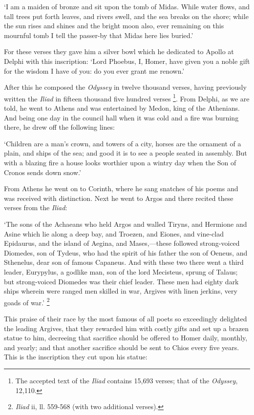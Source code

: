 ‘I am a maiden of bronze and sit upon the tomb of Midas. While water
flows, and tall trees put forth leaves, and rivers swell, and the sea breaks on
the shore; while the sun rises and shines and the bright moon also, ever
remaining on this mournful tomb I tell the passer-by that Midas here lies
buried.’

For these verses they gave him a silver bowl which he dedicated to Apollo at
Delphi with this inscription: ‘Lord Phoebus, I, Homer, have given you a
noble gift for the wisdom I have of you: do you ever grant me renown.’

After this he composed the \emph{Odyssey} in twelve thousand verses,
having previously written the \emph{Iliad} in fifteen thousand five
hundred verses \footnote{The accepted text of the
\emph{Iliad} contains 15,693 verses; that of the \emph{Odyssey},
12,110.}. From Delphi, as we are told, he
went to Athens and was entertained by Medon, king of the Athenians. And being
one day in the council hall when it was cold and a fire was burning there, he
drew off the following lines:

‘Children are a man’s crown, and towers of a city, horses are the
ornament of a plain, and ships of the sea; and good it is to see a people
seated in assembly. But with a blazing fire a house looks worthier upon a
wintry day when the Son of Cronos sends down snow.’

From Athens he went on to Corinth, where he sang snatches of his poems and was
received with distinction. Next he went to Argos and there recited these verses
from the \emph{Iliad}:

‘The sons of the Achaeans who held Argos and walled Tiryns, and Hermione
and Asine which lie along a deep bay, and Troezen, and Eiones, and vine-clad
Epidaurus, and the island of Aegina, and Mases,—these followed
strong-voiced Diomedes, son of Tydeus, who had the spirit of his father the son
of Oeneus, and Sthenelus, dear son of famous Capaneus. And with these two there
went a third leader, Eurypylus, a godlike man, son of the lord Mecisteus,
sprung of Talaus; but strong-voiced Diomedes was their chief leader. These men
had eighty dark ships wherein were ranged men skilled in war, Argives with
linen jerkins, very goads of war.’ \footnote{\emph{Iliad} ii,
ll. 559-568 (with two additional verses).}

This praise of their race by the most famous of all poets so exceedingly
delighted the leading Argives, that they rewarded him with costly gifts and set
up a brazen statue to him, decreeing that sacrifice should be offered to Homer
daily, monthly, and yearly; and that another sacrifice should be sent to Chios
every five years. This is the inscription they cut upon his statue:

